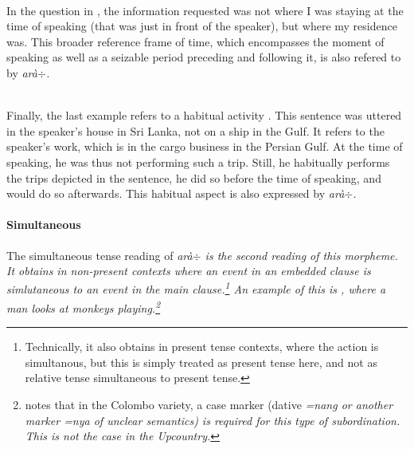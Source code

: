 \\


In the question in , the information requested was not where I was staying at the time of speaking (that was just in front of the speaker), but where my residence was. This broader reference frame of time, which encompasses the moment of speaking as well as a seizable period preceding and following it, is also refered to by \em arà$\div$\em.


\\ 

Finally, the last example refers to a habitual activity \citep[cf.][]{Ansaldo2009}. This sentence was uttered in the speaker's house in Sri Lanka, not on a ship in the Gulf. It refers to the speaker's work, which is in the cargo business in the Persian Gulf. At the time of speaking, he was thus not performing such a trip. Still, he habitually performs the trips depicted in the sentence, he did so before the time of speaking, and would do so afterwards. This habitual aspect is also expressed by \em arà$\div$.

\paragraph{Simultaneous}
The simultaneous tense reading of \em arà$\div$ is the second reading of this morpheme. It obtains in non-present contexts where an event in an embedded clause is simlutaneous to an event in the main clause.\footnote{Technically, it also obtains in present tense contexts, where the action is simultanous, but this is simply treated as present tense here, and not as relative tense simultaneous to present tense.} An example of this is , where a man looks at  monkeys playing.\footnote{\citet[147]{Slomanson2007cll} notes that in the Colombo variety, a case marker (dative \em =nang \em or another marker \em =nya \em of unclear semantics) is required for this type of subordination. This is not the case in the Upcountry.}

